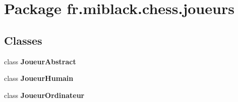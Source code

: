 \section{Package fr.\-miblack.\-chess.\-joueurs}
\label{namespacefr_1_1miblack_1_1chess_1_1joueurs}
\subsection*{Classes}
\begin{DoxyCompactItemize}
\item 
class {\bf Joueur\-Abstract}
\item 
class {\bf Joueur\-Humain}
\item 
class {\bf Joueur\-Ordinateur}
\end{DoxyCompactItemize}
